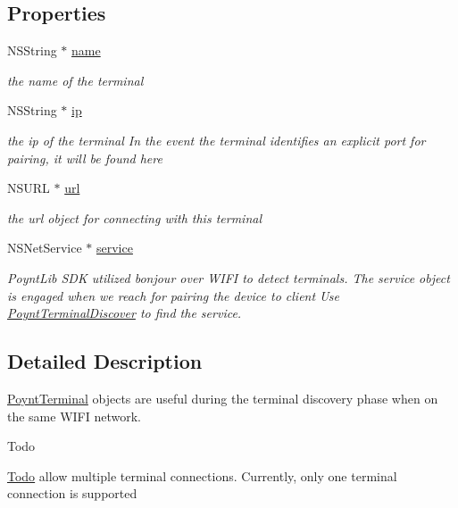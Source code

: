 \subsection*{Properties}
\begin{DoxyCompactItemize}
\item 
N\+S\+String $\ast$ \hyperlink{interface_poynt_terminal_a4b93d352d2fca75b34e1b5a50e03f587}{name}
\begin{DoxyCompactList}\small\item\em the name of the terminal \end{DoxyCompactList}\item 
N\+S\+String $\ast$ \hyperlink{interface_poynt_terminal_ab18eca4fc399814b2e86f54006b1e474}{ip}
\begin{DoxyCompactList}\small\item\em the ip of the terminal  In the event the terminal identifies an explicit port for pairing, it will be found here \end{DoxyCompactList}\item 
N\+S\+U\+RL $\ast$ \hyperlink{interface_poynt_terminal_a8d02094b967129e59efcc8c670677184}{url}
\begin{DoxyCompactList}\small\item\em the url object for connecting with this terminal \end{DoxyCompactList}\item 
N\+S\+Net\+Service $\ast$ \hyperlink{interface_poynt_terminal_a4c12c4a257de1f39c44a0a72b272246a}{service}
\begin{DoxyCompactList}\small\item\em Poynt\+Lib S\+DK utilized bonjour over W\+I\+FI to detect terminals. The service object is engaged when we reach for pairing the device to client  Use \hyperlink{interface_poynt_terminal_discover}{Poynt\+Terminal\+Discover} to find the service. \end{DoxyCompactList}\end{DoxyCompactItemize}


\subsection{Detailed Description}
\hyperlink{interface_poynt_terminal}{Poynt\+Terminal}  objects are useful during the terminal discovery phase when on the same W\+I\+FI network.

\begin{DoxyRefDesc}{Todo}
\item[\hyperlink{todo__todo000001}{Todo}]allow multiple terminal connections. Currently, only one terminal connection is supported \end{DoxyRefDesc}


